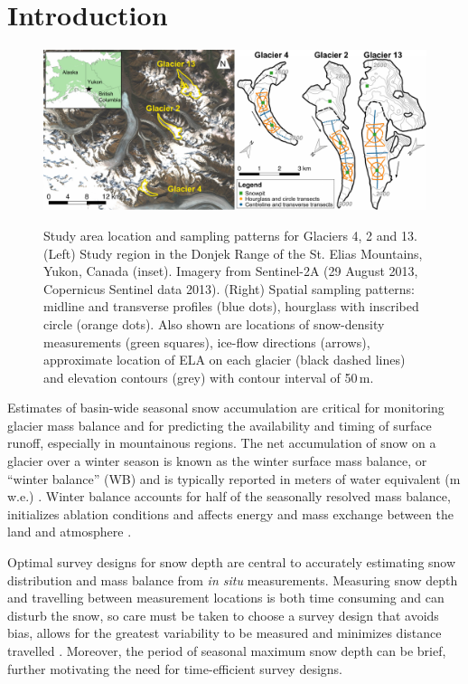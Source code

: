 \documentclass[twocolumn,letterpaper]{igs}
\begin{document}
\section{Introduction}

\begin{figure}
	\centering
	\includegraphics[width =\textwidth]{Pulwicki_Fig1.pdf}\\
	\caption{Study area location and sampling patterns for Glaciers 4, 2 and 13. (Left) Study region in the Donjek Range of the St. Elias Mountains, Yukon, Canada (inset). Imagery from Sentinel-2A (29 August 2013, Copernicus Sentinel data 2013). (Right) Spatial sampling patterns:  midline and transverse profiles (blue dots), hourglass with inscribed circle (orange dots). Also shown are locations of snow-density measurements  (green squares), ice-flow directions (arrows), approximate location of ELA on each glacier (black dashed lines) and elevation contours (grey) with contour interval of 50\,m.}
	\label{fig:Sampling}
\end{figure} 

Estimates of basin-wide seasonal snow accumulation are critical for monitoring glacier mass balance and for predicting the availability and timing of surface runoff, especially in mountainous regions. The net accumulation of snow on a glacier over a winter season is known as the winter surface mass balance, or ``winter balance'' (WB) and is typically reported in meters of water equivalent (m\,w.e.) \citep{Cogley2011}. Winter balance accounts for half of the seasonally resolved mass balance, initializes ablation conditions and affects energy and mass exchange between the land and atmosphere \citep[e.g.][]{Hock2005, Reveillet2016}. 

Optimal survey designs for snow depth are central to accurately estimating snow distribution and mass balance from \textit{in situ} measurements. Measuring snow depth and travelling between measurement locations is both time consuming and can disturb the snow, so care must be taken to choose a survey design that avoids bias, allows for the greatest variability to be measured and minimizes distance travelled \citep[e.g.][]{Shea2010,Kinar2015}. Moreover, the period of seasonal maximum snow depth can be brief, further motivating the need for time-efficient survey designs. 
\end{document}
